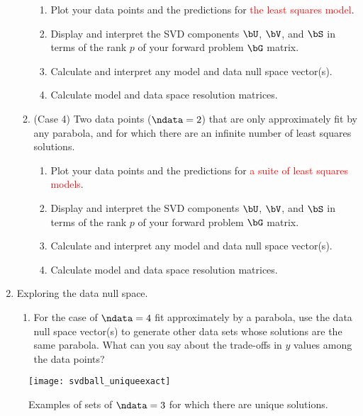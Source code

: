 \documentclass[11pt,titlepage,fleqn]{article}
\begin{document}
\begin{enumerate}
\begin{enumerate}
\begin{enumerate}
\item Plot your data points and the predictions for \textcolor{red}{the least squares model}.
\item Display and interpret the SVD components $\bU$, $\bV$, and $\bS$ in terms of the rank $p$ of your forward problem $\bG$ matrix.
\item Calculate and interpret any model and data null space vector(s).
\item Calculate model and data space resolution matrices.
\end{enumerate}

\item (Case 4) Two data points ($\ndata = 2$) that are only approximately fit by any parabola, and for which there are an infinite number of least squares solutions.
%
\begin{enumerate}
\item Plot your data points and the predictions for \textcolor{red}{a suite of least squares models}.
\item Display and interpret the SVD components $\bU$, $\bV$, and $\bS$ in terms of the rank $p$ of your forward problem $\bG$ matrix.
\item Calculate and interpret any model and data null space vector(s).
\item Calculate model and data space resolution matrices.
\end{enumerate}


\end{enumerate}

\item Exploring the data null space.

\begin{enumerate}
\item For the case of $\ndata = 4$ fit approximately by a parabola, use the data null space vector(s) to generate other data sets whose solutions are the same parabola. What can you say about the trade-offs in $y$ values among the data points?
\end{enumerate}

\end{enumerate}



\clearpage\pagebreak
\begin{figure}
\centering
\texttt{[image: svdball\_uniqueexact]}
\caption[]
{{
Examples of sets of $\ndata = 3$ for which there are unique solutions.
\label{fig:unique}
}}
\end{figure}

\end{document}
